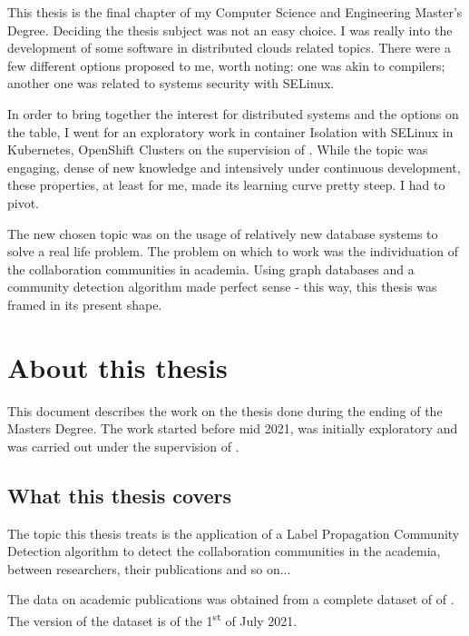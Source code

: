 This thesis is the final chapter of my Computer Science and Engineering Master's Degree.
Deciding the thesis subject was not an easy choice.
I was really into the development of some software in \glspl{distributed cloud} related topics.
There were a few different options proposed to me, worth noting:
one was akin to \glspl{compiler};
another one was related to \gls{systems security} with \gls{SELinux}.

In order to bring together the interest for \glspl{distributed system} and the options on the table, I went for an exploratory work in \Gls{container} Isolation with \gls{SELinux} in \gls{Kubernetes}, \gls{OpenShift} Clusters on the supervision of \mysupervisor.
While the topic was engaging, dense of new knowledge and intensively under \gls{continuous development}, these properties, at least for me, made its \gls{learning curve} pretty steep.
I had to pivot.

The new chosen topic was on the usage of relatively new database systems to solve a real life problem.
The problem on which to work was the individuation of the collaboration communities in academia.
Using graph databases and a community detection algorithm made perfect sense - this way, this thesis was framed in its present shape.

\section{About this thesis} \label{section:Preface/Aboutthisthesis}
This document describes the work on the thesis done during the ending of the \gls{Masters Degree}.%
The work started before mid 2021, was initially exploratory and was carried out under the supervision of \mysupervisor.

\subsection{What this thesis covers} \label{subsection:Preface/Aboutthisthesis/Whatthisthesiscovers}
The topic this thesis treats is the application of a \gls{Label Propagation} Community Detection algorithm to detect the collaboration communities in the academia, between researchers, their publications and so on...

The data on academic publications was obtained from a complete dataset of  of \citeauthor{Dagstuhl2021} .
The version of the dataset is of the 1\textsuperscript{st} of July 2021.

